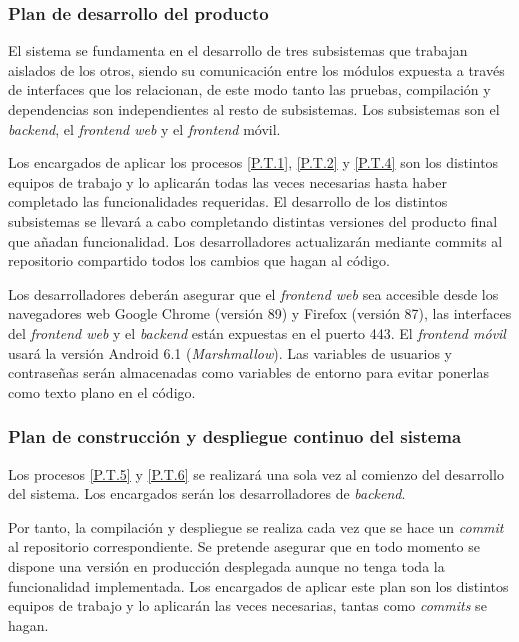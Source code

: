 \documentclass{article}
\begin{document}
\subsubsection{Plan de desarrollo del producto} \label{PL.T.2}

El sistema se fundamenta en el desarrollo de tres subsistemas que trabajan aislados de los otros, siendo su comunicación entre los módulos expuesta a través de interfaces que los relacionan, de este modo tanto las pruebas, compilación y dependencias son independientes al resto de subsistemas. Los subsistemas son el \textit{backend}, el \textit{frontend web} y el \textit{frontend} móvil. 

Los encargados de aplicar los procesos \ref{P.T.1}, \ref{P.T.2} y \ref{P.T.4} son los distintos equipos de trabajo y lo aplicarán todas las veces necesarias hasta haber completado las funcionalidades requeridas. El desarrollo de los distintos subsistemas se llevará a cabo completando distintas versiones del producto final que añadan funcionalidad. Los desarrolladores actualizarán mediante commits al repositorio compartido todos los cambios que hagan al código.

Los desarrolladores deberán asegurar que el \textit{frontend web} sea accesible desde los navegadores web Google Chrome (versión 89) y Firefox (versión 87), las interfaces del \textit{frontend web} y el \textit{backend} están expuestas en el puerto 443. El \textit{frontend móvil} usará la versión Android 6.1 (\textit{Marshmallow}). Las variables de usuarios y contraseñas serán almacenadas como variables de entorno para evitar ponerlas como texto plano en el código.


\subsubsection{Plan de construcción y despliegue continuo del sistema} \label{PL.T.3}
Los procesos \ref{P.T.5} y \ref{P.T.6} se realizará una sola vez al comienzo del desarrollo del sistema. Los encargados serán los desarrolladores de \textit{backend}. 

Por tanto, la compilación y despliegue se realiza cada vez que se hace un \textit{commit} al repositorio correspondiente. Se pretende asegurar que en todo momento se dispone una versión en producción desplegada aunque no tenga toda la funcionalidad implementada. Los encargados de aplicar este plan son los distintos equipos de trabajo y lo aplicarán las veces necesarias, tantas como \textit{commits} se hagan.
\end{document}
